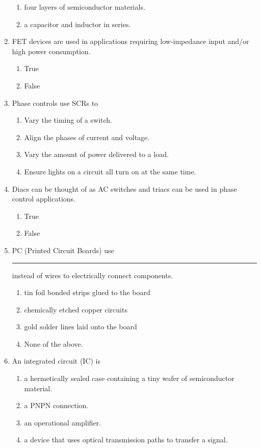 \documentclass[10pt]{article}
\begin{document}
\begin{multicols}{2}
\begin{enumerate}
\begin{enumerate}
	\item four layers of semiconductor materials.
	\item a capacitor and inductor in series.
	\end{enumerate}
\item FET devices are used in applications requiring low-impedance input and/or high power consumption.
	\begin{enumerate}
	\item True
	\item False
	\end{enumerate}
\item Phase controls use SCRs to
	\begin{enumerate}
	\item Vary the timing of a switch.
	\item Align the phases of current and voltage.
	\item Vary the amount of power delivered to a load.
	\item Ensure lights on a circuit all turn on at the same time.
	\end{enumerate}
\item Diacs can be thought of as AC switches and triacs can be used in phase control applications.
	\begin{enumerate}
	\item True
	\item False
	\end{enumerate}
\item PC (Printed Circuit Boards) use \rule{1cm}{0.15mm} instead of wires to electrically connect components.
	\begin{enumerate}
	\item tin foil bonded strips glued to the board
	\item chemically etched copper circuits
	\item gold solder lines laid onto the board
	\item None of the above.
	\end{enumerate}
\item An integrated circuit (IC) is
	\begin{enumerate}
	\item a hermetically sealed case containing a tiny wafer of semiconductor material.
	\item a PNPN connection.
	\item an operational amplifier.
	\item a device that uses optical transmission paths to transfer a signal.

\end{enumerate}
\end{enumerate}
\end{multicols}
\end{document}
